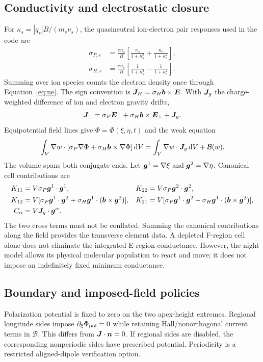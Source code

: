 \subsection{Conductivity and electrostatic closure}
For $\kappa_s=|q_s|B/(m_s\nu_s)$, the quasineutral ion-electron pair responses
used in the code are
\begin{align}
 \sigma_{P,s}&=\frac{en_s}{B}
  \left[\frac{\kappa_s}{1+\kappa_s^2}
       +\frac{\kappa_e}{1+\kappa_e^2}\right],\\
 \sigma_{H,s}&=\frac{en_s}{B}
  \left[\frac{1}{1+\kappa_s^2}-\frac{1}{1+\kappa_e^2}\right].
\end{align}
Summing over ion species counts the electron density once through
Equation~\eqref{eq:ne}. The sign convention is
$\bm J_H=\sigma_H\bm b\times\bm E$. With $\bm J_g$ the charge-weighted difference
of ion and electron gravity drifts,
\begin{equation}
 \bm J_\perp=\sigma_P\bm E_\perp+\sigma_H\bm b\times\bm E_\perp+\bm J_g.
\end{equation}
Equipotential field lines give $\Phi=\Phi(\xi,\eta,t)$ and the weak equation
\begin{equation}
 \int_V \nabla w\cdot[\sigma_P\nabla\Phi+
 \sigma_H\bm b\times\nabla\Phi]\,\mathrm d V
 =\int_V\nabla w\cdot\bm J_g\,\mathrm d V+\mathcal B(w).
 \label{eq:weak}
\end{equation}
The volume spans both conjugate ends. Let $\bm g^1=\nabla\xi$ and
$\bm g^2=\nabla\eta$. Canonical cell contributions are
\begin{align}
 K_{11}&=V\sigma_P\bm g^1\cdot\bm g^1,&
 K_{22}&=V\sigma_P\bm g^2\cdot\bm g^2,\\
 K_{12}&=V[\sigma_P\bm g^1\cdot\bm g^2+
            \sigma_H\bm g^1\cdot(\bm b\times\bm g^2)],&
 K_{21}&=V[\sigma_P\bm g^1\cdot\bm g^2-
            \sigma_H\bm g^1\cdot(\bm b\times\bm g^2)],\\
 C_\alpha&=V\bm J_g\cdot\bm g^\alpha.&&
\end{align}
The two cross terms must not be conflated. Summing the canonical contributions
along the field provides the transverse element data. A depleted F-region
cell alone does not eliminate the integrated E-region conductance. However,
the night model allows its physical molecular population to react and move;
it does not impose an indefinitely fixed minimum conductance.

\subsection{Boundary and imposed-field policies}
Polarization potential is fixed to zero on the two apex-height extremes.
Regional longitude sides impose $\partial_\xi\Phi_{\rm pol}=0$ while retaining
Hall/nonorthogonal current terms in $\mathcal B$. This differs from
$\bm J\cdot\bm n=0$. If regional sides are disabled, the corresponding
nonperiodic sides have prescribed potential. Periodicity is a restricted
aligned-dipole verification option.

